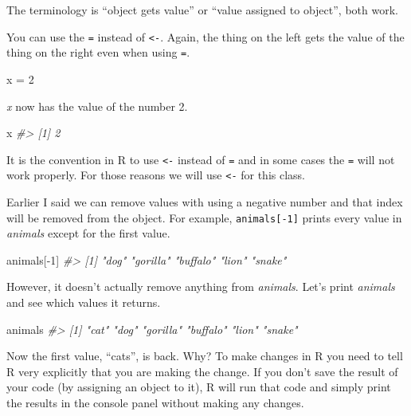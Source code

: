 \documentclass[
  12pt,
]{book}
\newenvironment{Shaded}{\begin{snugshade}}{\end{snugshade}}
\newcommand{\CommentTok}[1]{\textcolor[rgb]{0.37,0.37,0.37}{\textit{#1}}}
\newcommand{\DecValTok}[1]{\textcolor[rgb]{0.06,0.06,0.06}{#1}}
\newcommand{\NormalTok}[1]{#1}
\newcommand{\OtherTok}[1]{\textcolor[rgb]{0.37,0.37,0.37}{#1}}
\newcommand{\SpecialCharTok}[1]{\textcolor[rgb]{0,0,0}{#1}}
\begin{document}
The terminology is ``object gets value'' or ``value assigned to object'', both work.

You can use the \texttt{=} instead of \texttt{\textless{}-}. Again, the thing on the left gets the value of the thing on the right even when using \texttt{=}.

\begin{Shaded}
\begin{Highlighting}[]
\NormalTok{x }\OtherTok{=} \DecValTok{2}
\end{Highlighting}
\end{Shaded}

\emph{x} now has the value of the number 2.

\begin{Shaded}
\begin{Highlighting}[]
\NormalTok{x}
\CommentTok{\#\textgreater{} [1] 2}
\end{Highlighting}
\end{Shaded}

It is the convention in R to use \texttt{\textless{}-} instead of \texttt{=} and in some cases the \texttt{=} will not work properly. For those reasons we will use \texttt{\textless{}-} for this class.

Earlier I said we can remove values with using a negative number and that index will be removed from the object. For example, \texttt{animals{[}-1{]}} prints every value in \emph{animals} except for the first value.

\begin{Shaded}
\begin{Highlighting}[]
\NormalTok{animals[}\SpecialCharTok{{-}}\DecValTok{1}\NormalTok{]}
\CommentTok{\#\textgreater{} [1] "dog"     "gorilla" "buffalo" "lion"    "snake"}
\end{Highlighting}
\end{Shaded}

However, it doesn't actually remove anything from \emph{animals}. Let's print \emph{animals} and see which values it returns.

\begin{Shaded}
\begin{Highlighting}[]
\NormalTok{animals}
\CommentTok{\#\textgreater{} [1] "cat"     "dog"     "gorilla" "buffalo" "lion"    "snake"}
\end{Highlighting}
\end{Shaded}

Now the first value, ``cats'', is back. Why? To make changes in R you need to tell R very explicitly that you are making the change. If you don't save the result of your code (by assigning an object to it), R will run that code and simply print the results in the console panel without making any changes.
\end{document}
